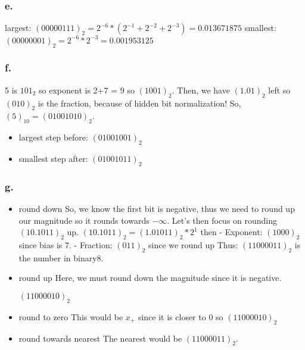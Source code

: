 \documentclass[12pt,a4paper]{article}
\begin{document}
\subsubsection*{e. } 

largest: $(0 0000 111)_2 =2^{-6} * (2^{-1} + 2^{-2} + 2^{-3}) = 0.013671875 $
\newline
smallest: $(0 0000 001)_2 = 2^{-6} * 2^{-3} = 0.001953125$




\subsubsection*{f. }

5 is $101_2$ so exponent is 2+7 = 9 so $(1001)_2$. Then, we have $(1.01)_2$ left so $(010)_2$ is the fraction, because of hidden bit normalization! So, $(5)_{10} = (0 1001 010)_2$.
\begin{itemize}
	\item largest step before: $(0 1001 001)_2$
	\item smallest step after: $(0 1001 011)_2$
\end{itemize}

\subsubsection*{g. }
\begin{itemize}
    \item round down \newline
        So, we know the first bit is negative, thus we need to round up our magnitude so it rounds towards $- \infty$. Let's then focus on rounding $(10.1011)_2$ up. 
        $(10.1011)_2 = (1.01011)_2 * 2^1$
        then \newline - Exponent: $(1000)_2$ since bias is 7. \newline 
        - Fraction: $(011)_2$ since we round up \newline 
        Thus: $(1 1000 011)_2$ is the number in binary8.
    \item round up \newline
        Here, we must round down the magnitude since it is negative.

        $(1 1000 010)_2$
    \item round to zero\newline
        This would be $x_+$ since it is closer to 0 so $(1 1000 010)_2$
    \item round towards nearest\newline
        The nearest would be $(1 1000 011)_2$.
\end{itemize}
\end{document}
